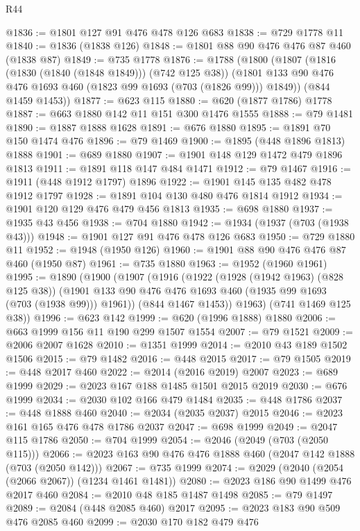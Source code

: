\begin{lexlean}{R44}
\begin{coremodule}
@1836 := @1801 @127 @91 @476 @478 @126 @683
@1838 := @729 @1778 @11
@1840 := @1836 (@1838 @126)
@1848 := @1801 @88 @90 @476 @476 @87 @460 (@1838 @87)
@1849 := @735 @1778
@1876 := @1788
    (@1800
      (@1807
        (@1816 (@1830 (@1840 (@1848 @1849))) (@742 @125 @38))
        (@1801 @133 @90 @476 @476 @1693 @460 (@1823 @99 @1693 (@703 (@1826 @99))) @1849))
      (@844 @1459 @1453))
@1877 := @623 @115
@1880 := @620 (@1877 @1786) @1778
@1887 := @663 @1880 @142 @11 @151 @300 @1476 @1555
@1888 := @79 @1481
@1890 := @1887 @1888 @1628
@1891 := @676 @1880
@1895 := @1891 @70 @150 @1474 @476
@1896 := @79 @1469
@1900 := @1895 (@448 @1896 @1813) @1888
@1901 := @689 @1880
@1907 := @1901 @148 @129 @1472 @479 @1896 @1813
@1911 := @1891 @118 @147 @484 @1471
@1912 := @79 @1467
@1916 := @1911 (@448 @1912 @1797) @1896
@1922 := @1901 @145 @135 @482 @478 @1912 @1797
@1928 := @1891 @104 @130 @480 @476 @1814 @1912
@1934 := @1901 @120 @129 @476 @479 @456 @1813
@1935 := @698 @1880
@1937 := @1935 @43 @456
@1938 := @704 @1880
@1942 := @1934 (@1937 (@703 (@1938 @43)))
@1948 := @1901 @127 @91 @476 @478 @126 @683
@1950 := @729 @1880 @11
@1952 := @1948 (@1950 @126)
@1960 := @1901 @88 @90 @476 @476 @87 @460 (@1950 @87)
@1961 := @735 @1880
@1963 := @1952 (@1960 @1961)
@1995 := @1890
    (@1900
      (@1907
        (@1916
          (@1922
            (@1928 (@1942 @1963) (@828 @125 @38))
            (@1901 @133 @90 @476 @476 @1693 @460 (@1935 @99 @1693 (@703 (@1938 @99))) @1961))
          (@844 @1467 @1453))
        @1963)
      (@741 @1469 @125 @38))
@1996 := @623 @142
@1999 := @620 (@1996 @1888) @1880
@2006 := @663 @1999 @156 @11 @190 @299 @1507 @1554
@2007 := @79 @1521
@2009 := @2006 @2007 @1628
@2010 := @1351 @1999
@2014 := @2010 @43 @189 @1502 @1506
@2015 := @79 @1482
@2016 := @448 @2015
@2017 := @79 @1505
@2019 := @448 @2017 @460
@2022 := @2014 (@2016 @2019) @2007
@2023 := @689 @1999
@2029 := @2023 @167 @188 @1485 @1501 @2015 @2019
@2030 := @676 @1999
@2034 := @2030 @102 @166 @479 @1484
@2035 := @448 @1786
@2037 := @448 @1888 @460
@2040 := @2034 (@2035 @2037) @2015
@2046 := @2023 @161 @165 @476 @478 @1786 @2037
@2047 := @698 @1999
@2049 := @2047 @115 @1786
@2050 := @704 @1999
@2054 := @2046 (@2049 (@703 (@2050 @115)))
@2066 := @2023 @163 @90 @476 @476 @1888 @460 (@2047 @142 @1888 (@703 (@2050 @142)))
@2067 := @735 @1999
@2074 := @2029 (@2040 (@2054 (@2066 @2067)) (@1234 @1461 @1481))
@2080 := @2023 @186 @90 @1499 @476 @2017 @460
@2084 := @2010 @48 @185 @1487 @1498
@2085 := @79 @1497
@2089 := @2084 (@448 @2085 @460) @2017
@2095 := @2023 @183 @90 @509 @476 @2085 @460
@2099 := @2030 @170 @182 @479 @476

\end{coremodule}
\end{lexlean}
